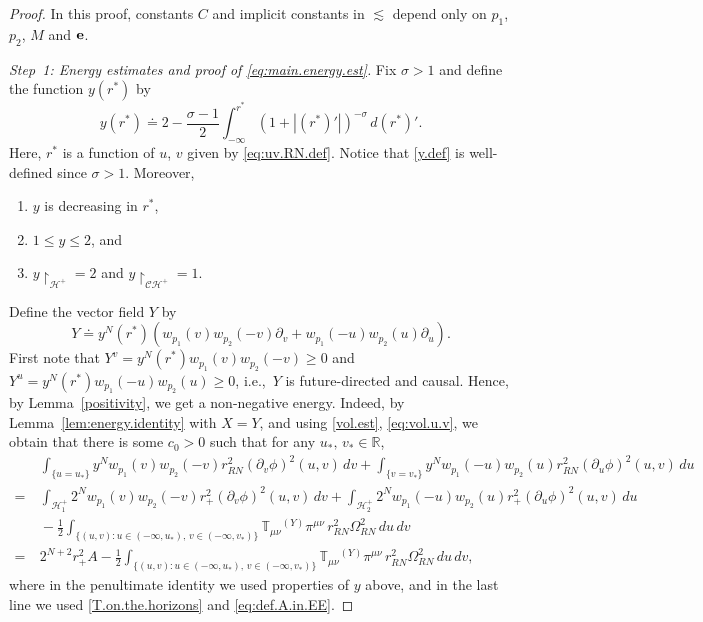 \documentclass[10pt, reqno]{amsart}
\theoremstyle{definition}
\theoremstyle{remark}
\numberwithin{equation}{section}
\def\ls{\lesssim}
\newcommand{\rd}{\partial}
\newcommand{\0}{\emptyset}
\newcommand{\Omg}{\Omega}
\newcommand{\calC}{\mathcal C}
\newcommand{\calH}{\mathcal H}
\newcommand{\f}{\frac}
\newcommand{\CH}{\calC \calH^{+}}		%
\newcommand{\EH}{\calH^{+}}
\newcommand{\pfstep}[1]{\vspace{.5em} {\it #1.}}
\begin{document}
\begin{proof}
In this proof, constants $C$ and implicit constants in $\ls$ depend only on $p_1$, $p_2$, $M$ and $\bf e$.

\pfstep{Step~1: Energy estimates and proof of \eqref{eq:main.energy.est}} Fix $\sigma>1$ and define the function $y(r^*)$ by
\begin{equation}\label{y.def}
y(r^*) \doteq 2-\f{\sigma-1}{2}\int_{-\infty}^{r^*} (1+|(r^*)'|)^{-\sigma}\, d(r^*)'.
\end{equation}
Here, $r^*$ is a function of $u$, $v$ given by \eqref{eq:uv.RN.def}. Notice that \eqref{y.def} is well-defined since $\sigma>1$. Moreover, 
\begin{enumerate}
\item $y$ is decreasing in $r^*$, 
\item $1\leq y\leq 2$, and
\item $y\restriction_{\EH} = 2$ and $y\restriction_{\CH} = 1$.
\end{enumerate}

Define the vector field $Y$ by 
\begin{equation}\label{Y.def}
Y \doteq y^N(r^*) \left(w_{p_1}(v)w_{p_2}(-v)\rd_v + w_{p_1}(-u)w_{p_2}(u)\rd_u\right).
\end{equation}
First note that $Y^v = y^N(r^*) w_{p_1}(v)w_{p_2}(-v)\geq 0$ and $Y^u = y^N(r^*) w_{p_1}(-u)w_{p_2}(u) \geq 0$, i.e.,~$Y$ is future-directed and causal. Hence, by Lemma~\ref{positivity}, we get a non-negative energy. Indeed, by Lemma~\ref{lem:energy.identity} with $X = Y$, and using \eqref{vol.est}, \eqref{eq:vol.u.v}, we obtain that there is some $c_0>0$ such that for any $u_*,\,v_*\in \mathbb R$,
\begin{equation}\label{eq;main.EE.before.est.bulk}
\begin{split}
&\: \int_{\{u=u_*\}} y^N w_{p_1}(v)w_{p_2}(-v) r_{RN}^2 (\rd_v\phi)^2(u,v) \, dv + \int_{\{v=v_*\}} y^N w_{p_1}(-u)w_{p_2}(u) r_{RN}^2(\rd_u\phi)^2(u,v) \, du \\
= &\:  \int_{\EH_1} 2^N w_{p_1}(v)w_{p_2}(-v) r_+^2 (\rd_v\phi)^2(u,v) \, dv + \int_{\EH_2} 2^N w_{p_1}(-u)w_{p_2}(u) r_+^2 (\rd_u\phi)^2(u,v) \, du \\
&\: - \frac{1}{2} \int_{\{(u,v): u\in (-\infty,u_*),\,v\in (-\infty,v_*)\}} \mathbb T_{\mu\nu}{ }^{(Y)}\pi^{\mu\nu} \,r_{RN}^2 \Omg_{RN}^2 \, du\, dv \\
=&\: 2^{N+2} r_+^2 A - \frac{1}{2} \int_{\{(u,v): u\in (-\infty,u_*),\,v\in (-\infty,v_*)\}} \mathbb T_{\mu\nu}{ }^{(Y)}\pi^{\mu\nu} \,r_{RN}^2 \Omg_{RN}^2 \, du\, dv,
\end{split}
\end{equation}
where in the penultimate identity we used properties of $y$ above, and in the last line we used \eqref{T.on.the.horizons} and \eqref{eq:def.A.in.EE}.


\end{proof}
\end{document}
